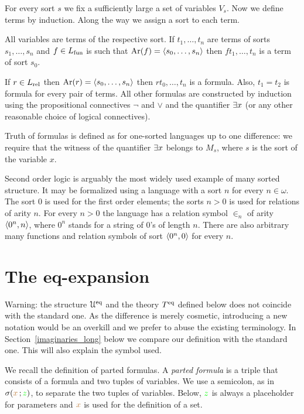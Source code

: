 \documentclass[creche.tex]{subfiles}
\begin{document}
For every sort $s$ we fix a sufficiently large a set of variables $V_s$. Now we define terms by induction. Along the way we assign a sort to each term. 

All variables are terms of the respective sort. If $t_1,\dots,t_n$ are terms of sorts $s_1,\dots,s_n$ and $f\in L_{\rm fun}$ is such that ${\rm Ar}(f)=\langle s_0,\dots,s_n\rangle$ then $ft_1,\dots,t_n$ is a term of sort $s_0$. 

If $r\in L_{\rm rel}$ then ${\rm Ar}(r)=\langle s_0,\dots,s_n\rangle$ then $rt_0,\dots,t_n$ is a formula. Also, $t_1=t_2$ is formula for every pair of terms. All other formulas are constructed by induction using the propositional connectives $\neg$ and $\vee$ and the quantifier $\exists x$ (or any other reasonable choice of logical connectives).

Truth of formulas is defined as for one-sorted languages up to one difference: we require that the witness of the quantifier $\exists x$ belongs to $M_s$, where $s$ is the sort of the variable $x$.

Second order logic is arguably the most widely used example of many sorted structure. It may be formalized using a language with a sort $n$ for every $n\in\omega$. The sort $0$ is used for the first order elements; the sorts $n>0$ is used for relations of arity $n$. For every $n>0$ the language has a relation symbol $\in_n$ of arity $\langle0^n,n\rangle$, where $0^n$ stands for a string of $0$'s of length $n$. There are also arbitrary many functions and relation symbols of sort $\langle0^n,0\rangle$ for every $n$.

\section{The eq-expansion}\label{immaginari}

\noindent\llap{\textcolor{red}{\Large\danger}\kern1.5ex}Warning: the structure $\EuScript U^{{\rm eq}}$ and the theory $T^{{\rm eq}}$ defined below does not coincide with the standard one. As the difference is merely cosmetic, introducing a new notation would be an overkill and we prefer to abuse the existing terminology. In Section~\ref{imaginaries_long} below we compare our definition with the standard one. This will also explain the symbol used.

We recall the definition of parted formulas. A \emph{parted formula\/} is a triple that consists of a formula and two tuples of variables. We use a semicolon, as in $\sigma({\color{brown} x}\,;{\color{green} z})$, to separate the two tuples of variables. Below, ${\color{green} z}$ is always a placeholder for parameters and ${\color{brown} x}$ is used for the definition of a set.
\end{document}
